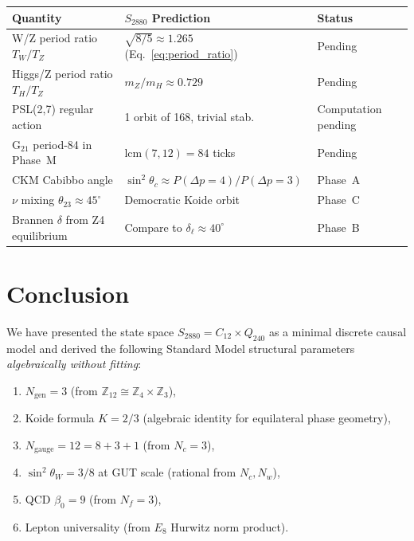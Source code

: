 \documentclass[11pt,a4paper]{article}
\theoremstyle{remark}
\begin{document}
\begin{center}
\begin{tabular}{p{5.2cm}p{5.5cm}p{2cm}}
  \toprule
  Quantity & $S_{2880}$ Prediction & Status \\
  \midrule
  W/Z period ratio $T_W/T_Z$ & $\sqrt{8/5} \approx 1.265$ (Eq.~\ref{eq:period_ratio}) & Pending \\
  Higgs/Z period ratio $T_H/T_Z$ & $m_Z/m_H \approx 0.729$ & Pending \\
  PSL(2,7) regular action & 1 orbit of 168, trivial stab. & Computation pending \\
  G$_{21}$ period-84 in Phase~M & $\mathrm{lcm}(7,12) = 84$ ticks & Pending \\
  CKM Cabibbo angle & $\sin^2\theta_c \approx P(\Delta p=4)/P(\Delta p=3)$ & Phase~A \\
  $\nu$ mixing $\theta_{23} \approx 45^\circ$ & Democratic Koide orbit & Phase~C \\
  Brannen $\delta$ from Z4 equilibrium & Compare to $\delta_\ell \approx 40^\circ$ & Phase~B \\
  \bottomrule
\end{tabular}
\end{center}

\section{Conclusion}
\label{sec:conclusion}

We have presented the state space $S_{2880} = C_{12} \times Q_{240}$ as a minimal
discrete causal model and derived the following Standard Model structural parameters
\emph{algebraically without fitting}:
\begin{enumerate}
  \item $N_{\mathrm{gen}} = 3$ (from $\mathbb{Z}_{12} \cong \mathbb{Z}_4 \times \mathbb{Z}_3$),
  \item Koide formula $K = 2/3$ (algebraic identity for equilateral phase geometry),
  \item $N_{\mathrm{gauge}} = 12 = 8+3+1$ (from $N_c = 3$),
  \item $\sin^2\theta_W = 3/8$ at GUT scale (rational from $N_c, N_w$),
  \item QCD $\beta_0 = 9$ (from $N_f = 3$),
  \item Lepton universality (from $E_8$ Hurwitz norm product).
\end{enumerate}
\end{document}

